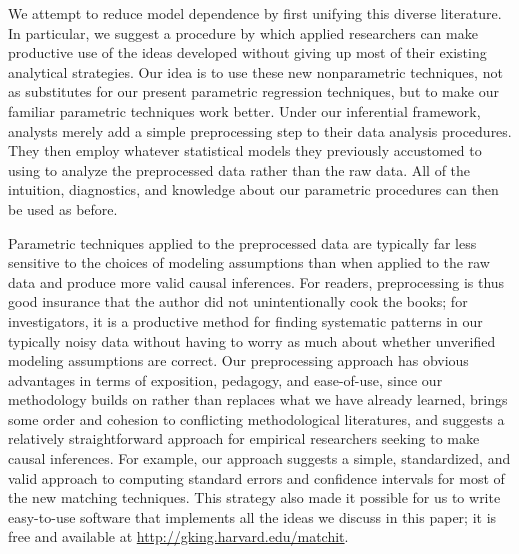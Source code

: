 \documentclass[11pt,titlepage]{article}
\begin{document}
We attempt to reduce model dependence by first unifying this diverse
literature.  In particular, we suggest a procedure by which applied
researchers can make productive use of the ideas developed without
giving up most of their existing analytical strategies.  Our idea is
to use these new nonparametric techniques, not as substitutes for our
present parametric regression techniques, but to make our familiar
parametric techniques work better.  Under our inferential framework,
analysts merely add a simple preprocessing step to their data analysis
procedures.  They then employ whatever statistical models they
previously accustomed to using to analyze the preprocessed data rather
than the raw data.  All of the intuition, diagnostics, and knowledge
about our parametric procedures can then be used as before.

Parametric techniques applied to the preprocessed data are typically
far less sensitive to the choices of modeling assumptions than when
applied to the raw data and produce more valid causal inferences.  For
readers, preprocessing is thus good insurance that the author did not
unintentionally cook the books; for investigators, it is a productive
method for finding systematic patterns in our typically noisy data
without having to worry as much about whether unverified modeling
assumptions are correct.  Our preprocessing approach has obvious
advantages in terms of exposition, pedagogy, and ease-of-use, since
our methodology builds on rather than replaces what we have already
learned, brings some order and cohesion to conflicting methodological
literatures, and suggests a relatively straightforward approach for
empirical researchers seeking to make causal inferences.  For example,
our approach suggests a simple, standardized, and valid approach to
computing standard errors and confidence intervals for most of the new
matching techniques.  This strategy also made it possible for us to
write easy-to-use software that implements all the ideas we discuss in
this paper; it is free and available at
\url{http://gking.harvard.edu/matchit}.
\end{document}
